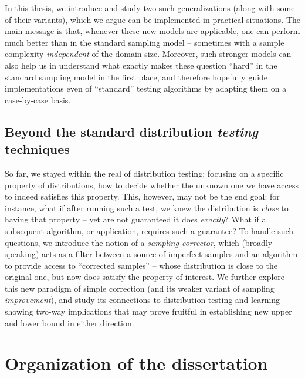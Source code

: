 In this thesis, we introduce and study two such generalizations (along with some of their variants), which we argue can be implemented in practical situations. The main message is that, whenever these new models are applicable, one can perform much better than in the standard sampling model -- sometimes with a sample complexity \emph{independent} of the domain size. Moreover, such stronger models can also help us in understand what exactly makes these question ``hard'' in the standard sampling model in the first place, and therefore hopefully guide implementations even of ``standard'' testing algorithms by adapting them on a case-by-case basis.

\subsection*{Beyond the standard distribution \emph{testing} techniques} So far, we stayed within the real of distribution testing: focusing on a specific property of distributions, how to decide whether the unknown one we have access to indeed satisfies this property. This, however, may not be the end goal: for instance, what if after running such a test, we knew the distribution is \emph{close} to having that property -- yet are not guaranteed it does \emph{exactly}? What if a subsequent algorithm, or application, requires such a guarantee? To handle such questions, we introduce the notion of a \emph{sampling corrector}, which (broadly speaking) acts as a filter between a source of imperfect samples and an algorithm to provide access to ``corrected samples'' -- whose distribution is close to the original one, but now does satisfy the property of interest. We further explore this new paradigm of simple correction (and its weaker variant of sampling \emph{improvement}), and study its connections to distribution testing and learning -- showing two-way implications that may prove fruitful in establishing new upper and lower bound in either direction. 

\section*{Organization of the dissertation}


